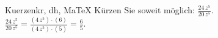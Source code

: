 \begin{MAufgabe}{Kuerzen}{kr, dh, MaTeX}
K\"urzen Sie soweit m\"oglich: $\frac{24\, z^5}{20\, z^5}$.\\ 
\ifLsg\MLoesung
\quad $\frac{24\, z^5}{20\, z^5}=\frac{(4\, z^5)\cdot(6)}{(4\, z^5)\cdot(5)}=\frac{6}{5}$.\else\relax\fi
 \end{MAufgabe}